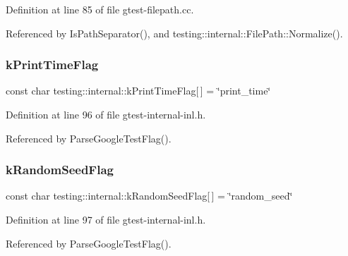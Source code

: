 Definition at line 85 of file gtest-\/filepath.\+cc.



Referenced by Is\+Path\+Separator(), and testing\+::internal\+::\+File\+Path\+::\+Normalize().

\mbox{\label{namespacetesting_1_1internal_aa6c13109bb4c78740ddb082b1ec0de56}} 
\subsubsection{\texorpdfstring{k\+Print\+Time\+Flag}{kPrintTimeFlag}}
{\footnotesize\ttfamily const char testing\+::internal\+::k\+Print\+Time\+Flag\mbox{[}$\,$\mbox{]} = \char`\"{}print\+\_\+time\char`\"{}}



Definition at line 96 of file gtest-\/internal-\/inl.\+h.



Referenced by Parse\+Google\+Test\+Flag().

\mbox{\label{namespacetesting_1_1internal_a964ad71443cfda304b3208bf5d2daa75}} 
\subsubsection{\texorpdfstring{k\+Random\+Seed\+Flag}{kRandomSeedFlag}}
{\footnotesize\ttfamily const char testing\+::internal\+::k\+Random\+Seed\+Flag\mbox{[}$\,$\mbox{]} = \char`\"{}random\+\_\+seed\char`\"{}}



Definition at line 97 of file gtest-\/internal-\/inl.\+h.



Referenced by Parse\+Google\+Test\+Flag().

\mbox{\label{namespacetesting_1_1internal_a764ee423d39ebb8e10c53ab9b685cd9b}} 
